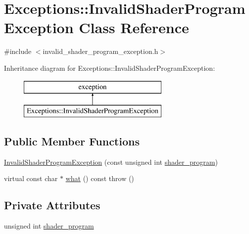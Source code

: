 \hypertarget{class_exceptions_1_1_invalid_shader_program_exception}{}\section{Exceptions\+:\+:Invalid\+Shader\+Program\+Exception Class Reference}
\label{class_exceptions_1_1_invalid_shader_program_exception}


{\ttfamily \#include $<$invalid\+\_\+shader\+\_\+program\+\_\+exception.\+h$>$}

Inheritance diagram for Exceptions\+:\+:Invalid\+Shader\+Program\+Exception\+:\begin{figure}[H]
\begin{center}
\leavevmode
\includegraphics[height=2.000000cm]{class_exceptions_1_1_invalid_shader_program_exception}
\end{center}
\end{figure}
\subsection*{Public Member Functions}
\begin{DoxyCompactItemize}
\item 
\hyperlink{class_exceptions_1_1_invalid_shader_program_exception_aaa3d4fe606a35fd3ae882bf9e00da7c2}{Invalid\+Shader\+Program\+Exception} (const unsigned int \hyperlink{class_exceptions_1_1_invalid_shader_program_exception_ad04a0590a5111a7267ca56dc595efb28}{shader\+\_\+program})
\item 
virtual const char $\ast$ \hyperlink{class_exceptions_1_1_invalid_shader_program_exception_a5fc30a59b16fc5afae6211b289177ce8}{what} () const   throw ()
\end{DoxyCompactItemize}
\subsection*{Private Attributes}
\begin{DoxyCompactItemize}
\item 
unsigned int \hyperlink{class_exceptions_1_1_invalid_shader_program_exception_ad04a0590a5111a7267ca56dc595efb28}{shader\+\_\+program}
\end{DoxyCompactItemize}


